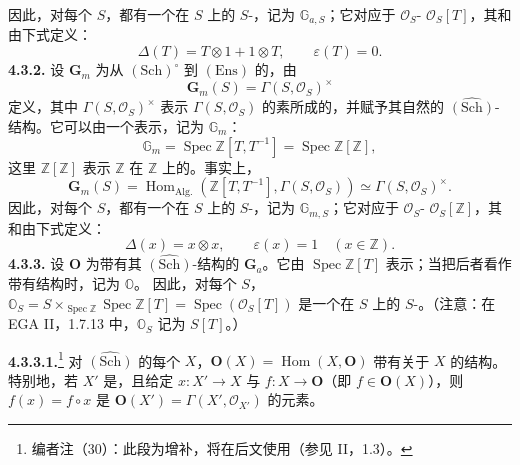 因此，对每个 $S$，都有一个在 $S$ 上的 $S$-，记为 $\mathbb G_{a,S}$；它对应于 $\mathcal O_S$- $\mathcal O_S[T]$，其和由下式定义：
\[
\Delta(T)=T\otimes1+1\otimes T,\qquad\varepsilon(T)=0.
\]
\textbf{4.3.2.} 设 $\mathbf G_m$ 为从 $(\mathrm{Sch})^\circ$ 到 $(\mathrm{Ens})$ 的，由
\[
\mathbf G_m(S)=\Gamma(S,\mathcal O_S)^\times
\]
定义，其中 $\Gamma(S,\mathcal O_S)^\times$ 表示 $\Gamma(S,\mathcal O_S)$ 的素所成的，并赋予其自然的 $\widehat{(\mathrm{Sch})}$-结构。它可以由一个表示，记为 $\mathbb G_m$：
\[
\mathbb G_m=\operatorname{Spec}\mathbb Z[T,T^{-1}]=\operatorname{Spec}\mathbb Z[\mathbb Z],
\]
这里 $\mathbb Z[\mathbb Z]$ 表示 $\mathbb Z$ 在 $\mathbb Z$ 上的。事实上，
\[
\mathbf G_m(S)=\operatorname{Hom}_{\mathrm{Alg.}}(\mathbb Z[T,T^{-1}],\Gamma(S,\mathcal O_S))\simeq\Gamma(S,\mathcal O_S)^\times.
\]
因此，对每个 $S$，都有一个在 $S$ 上的 $S$-，记为 $\mathbb G_{m,S}$；它对应于 $\mathcal O_S$- $\mathcal O_S[\mathbb Z]$，其和由下式定义：
\[
\Delta(x)=x\otimes x,\qquad\varepsilon(x)=1\quad(x\in\mathbb Z).
\]
\textbf{4.3.3.} 设 $\mathbf O$ 为带有其 $\widehat{(\mathrm{Sch})}$-结构的 $\mathbf G_a$。它由 $\operatorname{Spec}\mathbb Z[T]$ 表示；当把后者看作带有结构时，记为 $\mathbb O$。
因此，对每个 $S$，$\mathbb O_S=S\times_{\operatorname{Spec}\mathbb Z}\operatorname{Spec}\mathbb Z[T]=\operatorname{Spec}(\mathcal O_S[T])$ 是一个在 $S$ 上的 $S$-。（注意：在 EGA II，1.7.13 中，$\mathbb O_S$ 记为 $S[T]$。）

\textbf{4.3.3.1.}\footnote{编者注（30）：此段为增补，将在后文使用（参见 II，1.3）。} 对 $\widehat{(\mathrm{Sch})}$ 的每个 $X$，$\mathbf O(X)=\operatorname{Hom}(X,\mathbf O)$ 带有关于 $X$ 的结构。特别地，若 $X'$ 是，且给定 $x:X'\to X$ 与 $f:X\to\mathbf O$（即 $f\in\mathbf O(X)$），则 $f(x)=f\circ x$ 是 $\mathbf O(X')=\Gamma(X',\mathcal O_{X'})$ 的元素。

